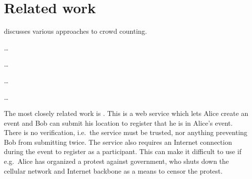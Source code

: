 \mode*
\section{Related work}

\Textcite{2016DemonstrationsInSeoul} discusses various approaches to crowd 
counting.

\Textcite{HowToEstimateCrowdSize} \dots

\Textcite{WifiCrowdCounting} \dots

\Textcite{CVCrowdCounting} \dots

\Textcite{NNCrowdCounting} \dots

The most closely related work is \textcite{CrowdCount.org}.
This is a web service which lets Alice create an event and Bob can submit his 
location to register that he is in Alice's event.
There is no verification, i.e.\ the service must be trusted, nor anything 
preventing Bob from submitting twice.
The service also requires an Internet connection during the event to register 
as a participant.
This can make it difficult to use if e.g.\ Alice has organized a protest 
against government, who shuts down the cellular network and Internet backbone 
as a means to censor the protest.
